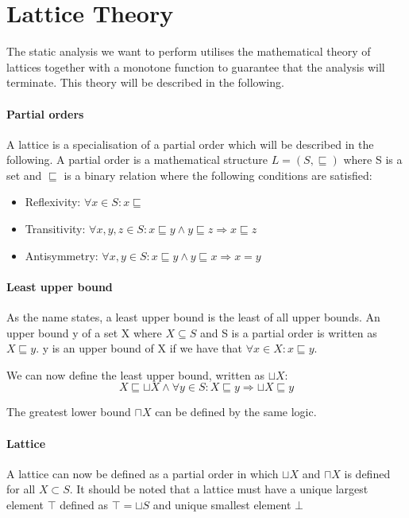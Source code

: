 \section{Lattice Theory}\label{lattice}
The static analysis we want to perform utilises the mathematical theory of lattices together with a monotone function to guarantee that the analysis will terminate.
This theory will be described in the following.

\paragraph{Partial orders}
A lattice is a specialisation of a partial order which will be described in the following.
A partial order is a mathematical structure $L = (S, \sqsubseteq)$ where S is a set and $\sqsubseteq$ is a binary relation where the following conditions are satisfied:
\begin{itemize}
  \item Reflexivity: $\forall x \in S : x \sqsubseteq$
  \item Transitivity: $\forall x,y,z \in S : x \sqsubseteq y \wedge y \sqsubseteq z \Rightarrow x \sqsubseteq z$
  \item Antisymmetry: $\forall x,y \in S: x \sqsubseteq y \wedge y \sqsubseteq x \Rightarrow x = y$
\end{itemize}


\paragraph{Least upper bound}
As the name states, a least upper bound is the least of all upper bounds.
An upper bound y of a set X where $ X \subseteq S$ and S is a partial order is written as $X \sqsubseteq y$.
y is an upper bound of X if we have that $\forall x \in X : x \sqsubseteq y$.

We can now define the least upper bound, written as $\sqcup X$:
\[X \sqsubseteq \sqcup X \wedge \forall y \in S : X \sqsubseteq y \Rightarrow \sqcup X \sqsubseteq y\]

The greatest lower bound $\sqcap X$ can be defined by the same logic.

\paragraph{Lattice}
A lattice can now be defined as a partial order in which $\sqcup X$ and $\sqcap X$ is defined for all $X \subset S$.
It should be noted  that a lattice must have a unique largest element $\top$ defined as $\top = \sqcup S$ and unique smallest element $\bot$ 

